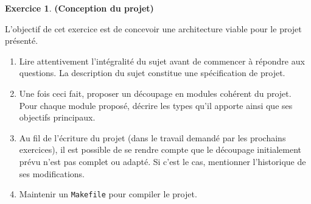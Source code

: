 \documentclass[12pt]{article}
\theoremstyle{definition}
\newtheorem{Exercice}{Exercice}
\begin{document}
\begin{Exercice} {\bf (Conception du projet)}\smallskip

L'objectif de cet exercice est de concevoir une architecture viable pour
le projet présenté.
\begin{enumerate}
    \item Lire attentivement l'intégralité du sujet avant de commencer
    à répondre aux questions. La description du sujet constitue une 
    spécification de projet. 
    \smallskip
    
    \item Une fois ceci fait, proposer un découpage en modules cohérent 
    du projet. Pour chaque module proposé, décrire les types qu'il apporte 
    ainsi que ses objectifs principaux.
    \smallskip
    
    \item Au fil de l'écriture du projet (dans le travail demandé par les 
    prochains exercices), il est possible de se rendre compte que le 
    découpage initialement prévu n'est pas complet ou adapté. Si c'est 
    le cas, mentionner l'historique de ses modifications.
    \smallskip
    
    \item Maintenir un {\tt Makefile} pour compiler le projet.
\end{enumerate}
\end{Exercice}
\bigskip
\end{document}

